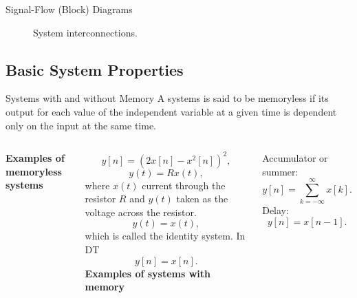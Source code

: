 \begin{frame}[plain]{Signal-Flow (Block) Diagrams}
    \begin{figure}
        \centering
        
        \caption{System interconnections.}\label{fi:sys_interconnections}
    \end{figure}
\end{frame}

\subsection{Basic System Properties}

\begin{frame}{Systems with and without Memory}
    A systems is said to be \alert{memoryless}  if its output for each value of the independent variable at a given time is dependent only on the input at the same time.
    \vspace{0.1in}
    \par
    \begin{columns}
            \textbf{Examples of memoryless systems}\par
            \begin{equation*}
                y[n] = (2x[n] - x^2[n])^2,
            \end{equation*}
            \begin{equation*}
                y(t) = Rx(t),
            \end{equation*}
            where $x(t)$ current through the resistor $R$ and $y(t)$ taken as the voltage across the resistor.
            \begin{equation*}
                y(t) = x(t),
            \end{equation*}
            which is called the \alert{identity system}. In DT
            \begin{equation*}
                y[n] = x[n].
            \end{equation*}
            \textbf{Examples of systems with memory}\par
            Accumulator or summer:
            \begin{equation*}
                y[n] = \sum_{k=-\infty}^{\infty}x[k].
            \end{equation*}
            Delay:
            \begin{equation*}
                y[n] = x[n-1].
            \end{equation*}

\end{columns}
\end{frame}
